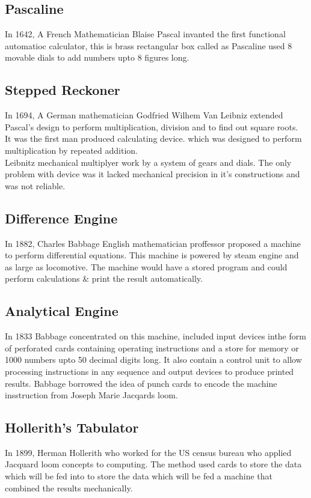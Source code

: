 \documentclass{article}
\begin{document}
	\subsection{Pascaline}
	In 1642, A French Mathematician Blaise Pascal invanted the first functional automatioc calculator, this is brass rectangular box called as Pascaline used 8 movable dials to add numbers upto 8 figures long.
	
	\subsection{Stepped Reckoner}
	In 1694, A German mathematician Godfried Wilhem Van Leibniz extended Pascal's design to perform multiplication, division and to find out square roots. \\
	It was the first man produced calculating device. which was designed to perform multiplication by repeated addition. \\
	Leibnitz mechanical multiplyer work by a system of gears and dials. The only problem with device was it lacked mechanical precision in it's constructions and was not reliable.
	
	\subsection{Difference Engine}
	In 1882, Charles Babbage English mathematician proffessor proposed a machine to perform differential equations. This machine is powered by steam engine and as large as locomotive. The machine would have a stored program and could perform calculations \& print the result automatically.
	
	\subsection{Analytical Engine}
	In 1833 Babbage concentrated on this machine, included input devices inthe form of perforated cards containing operating instructions and a store for memory or 1000 numbers upto 50 decimal digits long. It also contain a control unit to allow processing instructions in any sequence and output devices to produce printed results. Babbage borrowed the idea of punch cards to encode the machine insstruction from Joseph Marie Jacqards loom.
	
	\subsection{Hollerith's Tabulator}
	In 1899, Herman Hollerith who worked for the US census bureau who applied Jacquard loom concepts to computing. The method used cards to store the data which will be fed into to store the data which will be fed a machine that combined the results mechanically.
	
\end{document}
